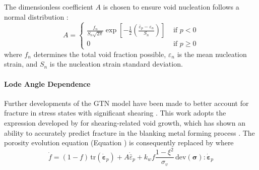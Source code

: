 \documentclass[sn-mathphys,Numbered,draft]{sn-jnl}%
\newcommand{\bb}{\boldsymbol}
\begin{document}
The dimensionless coefficient $A$ is chosen to ensure void nucleation follows a normal distribution \cite{chu_void_1980}:
\begin{equation} \label{eqn:nucleatonA}
	A =
	\begin{cases}
	\frac{f_n}{S_n \sqrt{2 \pi}} \exp \left[-\frac{1}{2}\left(\frac{\bar{\varepsilon}_p-\varepsilon_n}{S_n}\right)\right] & \text { if } p < 0 \\
	0 & \text { if } p \geq 0
	\end{cases}
\end{equation}
where $f_n$ determines the total void fraction possible, $\varepsilon_n$ is the mean nucleation strain, and $S_n$ is the nucleation strain standard deviation. 



\paragraph{Lode Angle Dependence}

Further developments of the GTN model have been made to better account for fracture in stress states with significant shearing \cite{nahshon_modification_2008, malcher_continuum_2012, leclerc_micromechanics-based_2020, achouri_numerical_2013}.
This work adopts the expression developed by \citet{nahshon_modification_2008} for shearing-related void growth, which has shown an ability to accurately predict fracture in the blanking metal forming process \cite{achouri_numerical_2013}.
The porosity evolution equation (Equation \label{eqn:GTN4}) is consequently replaced by
where
\begin{equation}
	\dot{f} = (1-f) \, \text{tr}\left(\dot{\boldsymbol{\varepsilon}}_p\right)+A \dot{\bar{\varepsilon}}_p
	+ k_w f\frac{1 - \xi^2 }{\sigma_v} \,\text{dev}(\bb{\sigma}):{\dot{\boldsymbol{\varepsilon}}}_p
\end{equation}
\end{document}
